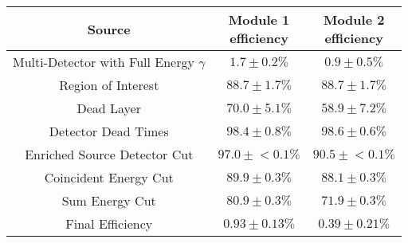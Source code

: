 \begin{tabular}{|c|c|c|}
\hline
  Source & \makecell{Module 1\\efficiency} & \makecell{Module 2\\efficiency} \\
\hline
  \makecell{Multi-Detector with\\Full Energy $\gamma$} & $1.7 \pm 0.2\%$ & $0.9 \pm 0.5\%$ \\
  Region of Interest & $88.7 \pm 1.7\%$ & $88.7 \pm 1.7\%$ \\
  Dead Layer & $70.0 \pm 5.1\%$ & $58.9 \pm 7.2\%$ \\
  Detector Dead Times & $98.4 \pm 0.8\%$ & $98.6 \pm 0.6\%$ \\
  Enriched Source Detector Cut & $97.0 \pm{}<\!0.1\%$ & $90.5 \pm{}<\!0.1\%$ \\
  Coincident Energy Cut & $89.9 \pm 0.3\%$ & $88.1 \pm 0.3\%$ \\
  Sum Energy Cut & $80.9 \pm 0.3\%$ & $71.9 \pm 0.3\%$ \\
  \hline Final Efficiency & $0.93 \pm 0.13\%$ & $0.39 \pm 0.21\%$ \\
\hline
\end{tabular}
